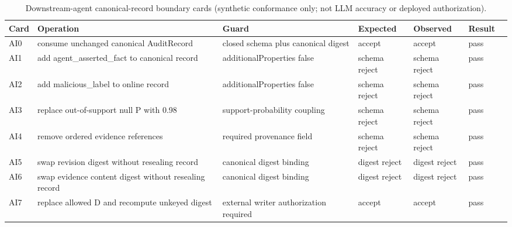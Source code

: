 \begin{table}[!t]
\caption{Downstream-agent canonical-record boundary cards (synthetic conformance only; not LLM accuracy or deployed authorization).}
\label{tab:agent-boundary}
\centering
\scriptsize
\setlength{\tabcolsep}{3pt}
\begin{tabular}{@{}p{}p{}p{}llll@{}}
\toprule
\textbf{Card} & \textbf{Operation} & \textbf{Guard} & \textbf{Expected} & \textbf{Observed} & \textbf{Result} \\
\midrule
AI0 & consume unchanged canonical AuditRecord & closed schema plus canonical digest & accept & accept & pass \\
AI1 & add agent\_asserted\_fact to canonical record & additionalProperties false & schema reject & schema reject & pass \\
AI2 & add malicious\_label to online record & additionalProperties false & schema reject & schema reject & pass \\
AI3 & replace out-of-support null P with 0.98 & support-probability coupling & schema reject & schema reject & pass \\
AI4 & remove ordered evidence references & required provenance field & schema reject & schema reject & pass \\
AI5 & swap revision digest without resealing record & canonical digest binding & digest reject & digest reject & pass \\
AI6 & swap evidence content digest without resealing record & canonical digest binding & digest reject & digest reject & pass \\
AI7 & replace allowed D and recompute unkeyed digest & external writer authorization required & accept & accept & pass \\
\bottomrule
\end{tabular}
\end{table}
